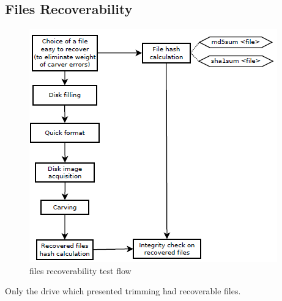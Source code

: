     \subsection{Files Recoverability}
        \begin{figure}[ht!]
            \centering
            \includegraphics[width=0.8\linewidth]{recoverability.png}
            \caption{files recoverability test flow}
        \end{figure}
        Only the drive which presented trimming had recoverable files.